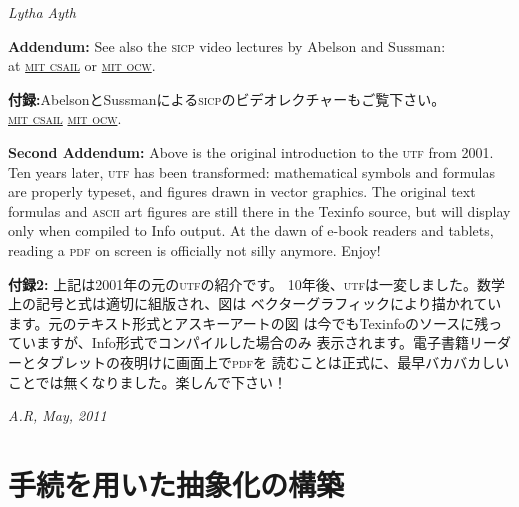 \documentclass[8pt,oneside]{book}
\newcommand{\acronym}[1]{\textsc{\MakeLowercase{#1}}}
\begin{document}
\noindent
\textit{Lytha Ayth}

\vspace{1.0em}
\noindent
\textbf{Addendum:} See also the \acronym{SICP} video lectures by Abelson and Sussman:\\
at \href{http://groups.csail.mit.edu/mac/classes/6.001/abelson-sussman-lectures/}{\acronym{MIT CSAIL}} or 
\href{http://ocw.mit.edu/courses/electrical-engineering-and-computer-science/6-001-structure-and-interpretation-of-computer-programs-spring-2005/video-lectures/}{\acronym{MIT OCW}}.

\textbf{付録:}AbelsonとSussmanによる\acronym{SICP}のビデオレクチャーもご覧下さい。\\
\href{http://groups.csail.mit.edu/mac/classes/6.001/abelson-sussman-lectures/}{\acronym{MIT CSAIL}}
\href{http://ocw.mit.edu/courses/electrical-engineering-and-computer-science/6-001-structure-and-interpretation-of-computer-programs-spring-2005/video-lectures/}{\acronym{MIT OCW}}.


\vspace{0.5em}
\noindent 
\textbf{Second Addendum:} Above is the original introduction to the \acronym{UTF} 
from 2001. Ten years later, \acronym{UTF} has been transformed: mathematical 
symbols and formulas are properly typeset, and figures drawn in 
vector graphics. The original text formulas and \acronym{ASCII} art figures 
are still there in the Texinfo source, but will display only when compiled 
to Info output. At the dawn of e-book readers and tablets, reading a 
\acronym{PDF} on screen is officially not silly anymore. Enjoy!

\noindent
\textbf{付録2:} 上記は2001年の元の\acronym{UTF}の紹介です。
10年後、\acronym{UTF}は一変しました。数学上の記号と式は適切に組版され、図は
ベクターグラフィックにより描かれています。元のテキスト形式とアスキーアートの図
は今でもTexinfoのソースに残っていますが、Info形式でコンパイルした場合のみ
表示されます。電子書籍リーダーとタブレットの夜明けに画面上で\acronym{PDF}を
読むことは正式に、最早バカバカしいことでは無くなりました。楽しんで下さい！

\vspace{0.5em}
\noindent
\textit{A.R, May, 2011}

\label{Chapter 1}
\chapter{手続を用いた抽象化の構築}

\end{document}
